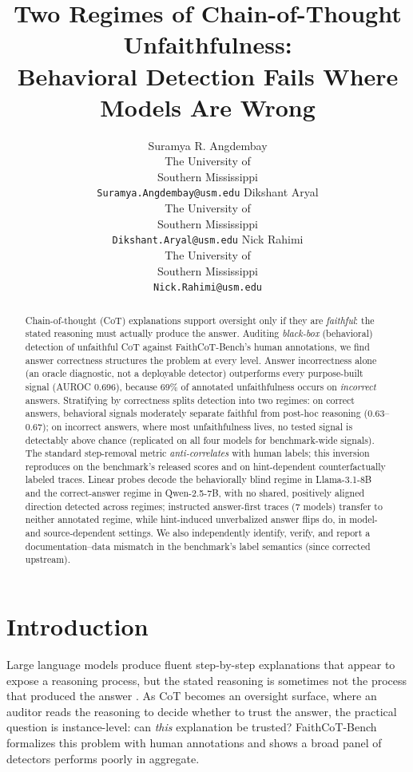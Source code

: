 \documentclass[11pt]{article}
\title{Two Regimes of Chain-of-Thought Unfaithfulness:\\Behavioral Detection Fails Where Models Are Wrong}
\author{Suramya R. Angdembay \\
  The University of \\ Southern Mississippi \\
  \texttt{Suramya.Angdembay@usm.edu} \And
  Dikshant Aryal \\
  The University of \\ Southern Mississippi \\
  \texttt{Dikshant.Aryal@usm.edu} \And
  Nick Rahimi \\
  The University of \\ Southern Mississippi \\
  \texttt{Nick.Rahimi@usm.edu}}
\begin{document}
\maketitle

\begin{abstract}
Chain-of-thought (CoT) explanations support oversight only if they are \emph{faithful}: the stated reasoning must actually produce the answer. Auditing \emph{black-box} (behavioral) detection of unfaithful CoT against FaithCoT-Bench's human annotations, we find answer correctness structures the problem at every level. Answer incorrectness alone (an oracle diagnostic, not a deployable detector) outperforms every purpose-built signal (AUROC 0.696), because 69\% of annotated unfaithfulness occurs on \emph{incorrect} answers. Stratifying by correctness splits detection into two regimes: on correct answers, behavioral signals moderately separate faithful from post-hoc reasoning (0.63--0.67); on incorrect answers, where most unfaithfulness lives, no tested signal is detectably above chance (replicated on all four models for benchmark-wide signals). The standard step-removal metric \emph{anti-correlates} with human labels; this inversion reproduces on the benchmark's released scores and on hint-dependent counterfactually labeled traces. Linear probes decode the behaviorally blind regime in Llama-3.1-8B and the correct-answer regime in Qwen-2.5-7B, with no shared, positively aligned direction detected across regimes; instructed answer-first traces (7 models) transfer to neither annotated regime, while hint-induced unverbalized answer flips do, in model- and source-dependent settings. We also independently identify, verify, and report a documentation--data mismatch in the benchmark's label semantics (since corrected upstream).
\end{abstract}

\section{Introduction}

Large language models produce fluent step-by-step explanations that appear to expose a reasoning process, but the stated reasoning is sometimes not the process that produced the answer \citep{lanham2023measuring,turpin2023language,chen2025reasoning}. As CoT becomes an oversight surface, where an auditor reads the reasoning to decide whether to trust the answer, the practical question is instance-level: can \emph{this} explanation be trusted? FaithCoT-Bench \citep{shen2026faithcot} formalizes this problem with human annotations and shows a broad panel of detectors performs poorly in aggregate.
\end{document}
